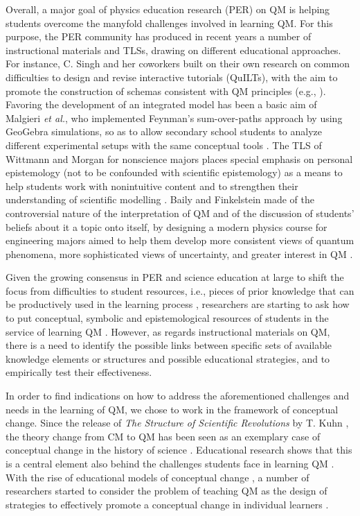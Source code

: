 \documentclass[twocolumn,secnumarabic,amssymb, nobibnotes, aps, prd, nofootinbib]{revtex4-2}
\begin{document}
Overall, a major goal of physics education research (PER) on QM is helping students overcome the manyfold  challenges involved in learning QM. For this purpose, the PER community has produced in recent years a number of instructional materials and TLSs, drawing on different educational approaches. For instance, C. Singh and her coworkers built on their own research on common difficulties to design and revise interactive tutorials (QuILTs), with the aim to promote the construction of schemas consistent with QM principles (e.g., \cite{Marshman2017}). Favoring the development of an integrated model has been a basic aim of Malgieri \textit{et al.}, who implemented Feynman's sum-over-paths approach by using GeoGebra simulations, so as to allow secondary school students to analyze different experimental setups with the same conceptual tools \cite{Malgieri2017}.  The TLS of Wittmann and Morgan for nonscience majors places special emphasis on personal epistemology (not to be confounded with scientific epistemology) as a means to help students work with nonintuitive content and to strengthen their understanding of scientific modelling \cite{Wittmann2020}. Baily and Finkelstein made of the controversial nature of the interpretation of QM and of the discussion of students' beliefs about it a topic onto itself, by designing a modern physics course for engineering majors aimed to help them develop more consistent views of quantum phenomena, more sophisticated views of uncertainty, and greater interest in QM \cite{Baily2015}.

Given the growing consensus in PER and science education at large to shift the focus from difficulties to student resources, i.e., pieces of prior knowledge that can be productively used in the learning process \cite{Coppola2013, Goodhew2019}, researchers are starting to ask how to put conceptual, symbolic and epistemological resources of students in the service of learning QM \cite{Dreyfus2017, Dini2017}. However, as regards instructional materials on QM, there is a need to identify the possible links between specific sets of available knowledge elements or structures and possible educational strategies, and to empirically test their effectiveness.

In order to find indications on how to address the aforementioned challenges and needs in the learning of QM, we chose to work in the framework of conceptual change. Since the release of \textit{The Structure of Scientific Revolutions} by T. Kuhn \cite{Kuhn1962}, the theory change from CM to QM has been seen as an exemplary case of conceptual change in the history of science \cite{Thagard1992}. Educational research shows that this is a central element also behind the challenges students face in learning QM \cite{Tsaparlis2009, Singh2015, Lewerissa2017}. With the rise of educational models of conceptual change \cite{Posner1982, Potvin2020}, a number of researchers started to consider the problem of teaching QM as the design of strategies to effectively promote a conceptual change in individual learners \cite{Thagard1992, Kalkanis2003, Tsaparlis2013, Malgieri2017}.
\end{document}
